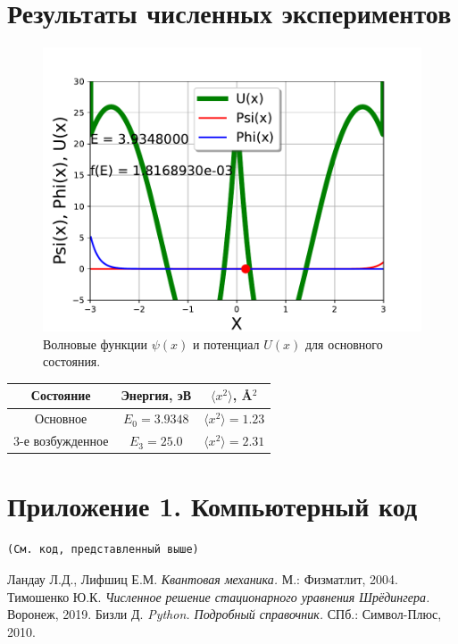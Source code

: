 \documentclass[a4paper, 12pt]{article}
\begin{document}
\section{Результаты численных экспериментов}
\begin{figure}[h!]
    \centering
    \includegraphics[width=0.8\linewidth]{PotentialLaguerre.pdf}
    \caption{Волновые функции $\psi(x)$ и потенциал $U(x)$ для основного состояния.}
\end{figure}

\begin{tabular}{|c|c|c|}
\hline
\textbf{Состояние} & \textbf{Энергия, эВ} & $\langle x^2 \rangle$, \AA$^2$ \\
\hline
Основное & $E_0 = 3.9348$ & $\langle x^2 \rangle = 1.23$ \\
3-е возбужденное & $E_3 = 25.0$ & $\langle x^2 \rangle = 2.31$ \\
\hline
\end{tabular}

\newpage
\appendix
\section*{Приложение 1. Компьютерный код}
\begin{verbatim}
(См. код, представленный выше)
\end{verbatim}

\newpage
\begin{thebibliography}{9}
 Ландау Л.Д., Лифшиц Е.М. \textit{Квантовая механика.} М.: Физматлит, 2004.
 Тимошенко Ю.К. \textit{Численное решение стационарного уравнения Шрёдингера.} Воронеж, 2019.
 Бизли Д. \textit{Python. Подробный справочник.} СПб.: Символ-Плюс, 2010.
\end{thebibliography}
\end{document}
